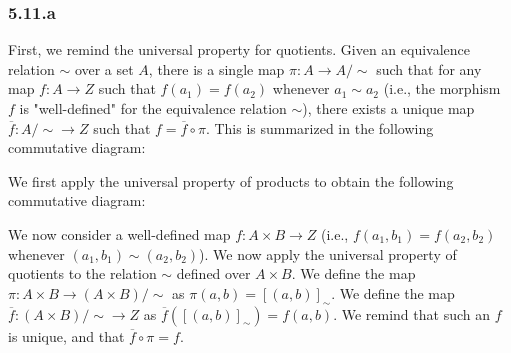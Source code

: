 \documentclass[12pt, letterpaper, twoside]{report}
\begin{document}
\subsubsection*{5.11.a}

First, we remind the universal property for quotients. Given an equivalence relation $\sim$ over a set $A$, there is a single map $\pi : A \to A/\sim$ such that for any map $f : A \to Z$ such that $f(a_1) = f(a_2)$ whenever $a_1 \sim a_2$ (i.e., the morphism $f$ is "well-defined" for the equivalence relation $\sim$), there exists a unique map $\overline{f} : A/\sim \to Z$ such that $f = \overline{f} \circ \pi$. This is summarized in the following commutative diagram:


We first apply the universal property of products to obtain the following commutative diagram:


We now consider a well-defined map $f : A \times B \to Z$ (i.e., $f(a_1, b_1) = f(a_2, b_2)$ whenever $(a_1, b_1) \sim (a_2, b_2)$). We now apply the universal property of quotients to the relation $\sim$ defined over $A \times B$. We define the map $\pi : A \times B \to (A \times B)/\sim$ as $\pi(a,b) = [(a,b)]_\sim$. We define the map $\overline{f} : (A \times B)/\sim \to Z$ as $\overline{f}([(a,b)]_\sim) = f(a,b)$. We remind that such an $f$ is unique, and that $\overline{f} \circ \pi = f$.
\end{document}
